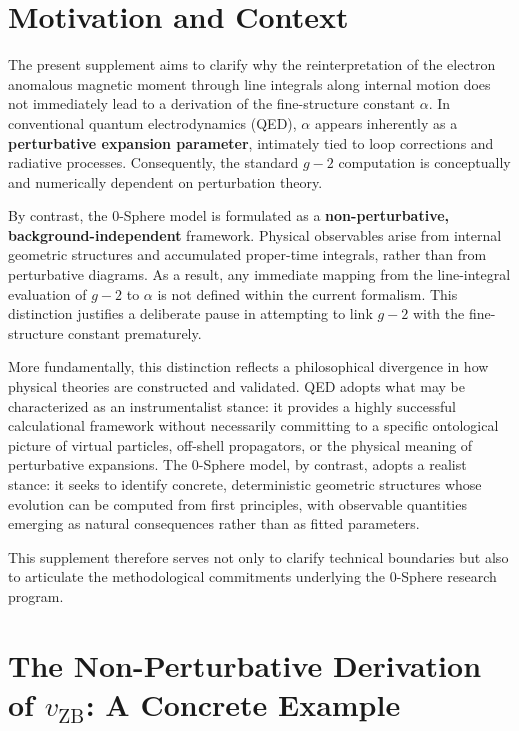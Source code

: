 \documentclass[12pt,letterpaper]{article}
\begin{document}
\section{Motivation and Context}

The present supplement aims to clarify why the reinterpretation of the electron anomalous magnetic moment through line integrals along internal motion does not immediately lead to a derivation of the fine-structure constant $\alpha$. 
In conventional quantum electrodynamics (QED), $\alpha$ appears inherently as a \textbf{perturbative expansion parameter}, intimately tied to loop corrections and radiative processes. 
Consequently, the standard $g-2$ computation is conceptually and numerically dependent on perturbation theory.

By contrast, the 0-Sphere model is formulated as a \textbf{non-perturbative, background-independent} framework. 
Physical observables arise from internal geometric structures and accumulated proper-time integrals, rather than from perturbative diagrams. 
As a result, any immediate mapping from the line-integral evaluation of $g-2$ to $\alpha$ is not defined within the current formalism. 
This distinction justifies a deliberate pause in attempting to link $g-2$ with the fine-structure constant prematurely.

More fundamentally, this distinction reflects a philosophical divergence in how physical theories are constructed and validated. QED adopts what may be characterized as an instrumentalist stance: it provides a highly successful calculational framework without necessarily committing to a specific ontological picture of virtual particles, off-shell propagators, or the physical meaning of perturbative expansions. The 0-Sphere model, by contrast, adopts a realist stance: it seeks to identify concrete, deterministic geometric structures whose evolution can be computed from first principles, with observable quantities emerging as natural consequences rather than as fitted parameters.

This supplement therefore serves not only to clarify technical boundaries but also to articulate the methodological commitments underlying the 0-Sphere research program.


\section{The Non-Perturbative Derivation of $v_{\mathrm{ZB}}$: A Concrete Example}
\end{document}
